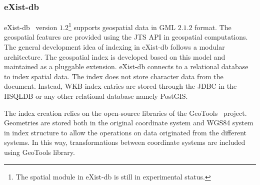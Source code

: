 \documentclass[a4paper,12pt]{article}
\begin{document}
\subsubsection{eXist-db}

eXist-db~\cite{existdb} version $1.2$\footnote{The spatial module in eXist-db is still in experimental status.} supports geospatial data in GML $2.1.2$ format. The geo\-spatial features are provided using the JTS API in geospatial computations. 
The general development idea of indexing in eXist-db follows a modular architecture.
The geospatial index is developed based on this model and maintained as a pluggable extension. 
eXist-db connects to a relational database to index spatial data. The index does not store character data from the document. Instead, WKB index entries are stored through the JDBC in the HSQLDB or any other relational database namely PostGIS. 

The index creation relies on the open-source libraries of the GeoTools~\cite{geotools} project. Geometries are stored both in the original coordinate system and WGS84 system in index structure to allow the operations on data originated from the different systems. In this way, transformations between coordinate systems are included using GeoTools library.
 
\end{document}
